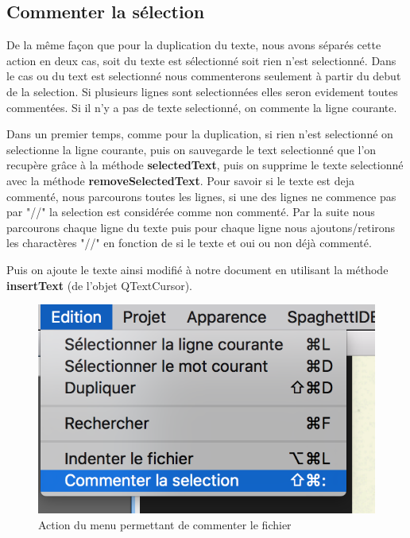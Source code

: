 \documentclass[a4paper,12pt]{article}
\begin{document}
\subsection{Commenter la sélection}

	De la même façon que pour la duplication du texte, nous avons séparés cette action en deux cas, soit du texte est sélectionné soit rien n'est selectionné.
	Dans le cas ou du text est selectionné nous commenterons seulement à partir du debut de la selection. Si plusieurs lignes sont selectionnées elles seron evidement toutes commentées. Si il n'y a pas de texte selectionné, on commente la ligne courante.

	Dans un premier temps, comme pour la duplication, si rien n'est selectionné on selectionne la ligne courante, puis on sauvegarde le text selectionné que l'on recupère grâce à la méthode \textbf{selectedText}, puis on supprime le texte selectionné avec la méthode \textbf{removeSelectedText}. Pour savoir si le texte est deja commenté, nous parcourons toutes les lignes, si une des lignes ne commence pas par "//" la selection est considérée comme non commenté. Par la suite nous parcourons chaque ligne du texte puis pour chaque ligne nous ajoutons/retirons les charactères "//" en fonction de si le texte et oui ou non déjà commenté.

	Puis on ajoute le texte ainsi modifié à notre document en utilisant la méthode \textbf{insertText} (de l'objet QTextCursor).

	\begin{figure}[h!]

		\begin{center}
			\includegraphics[scale=0.8]{images/imgs_edit/utilisation_commentaire}
			\caption{Action du menu permettant de commenter le fichier}
		\end{center}
	\end{figure}
\end{document}
